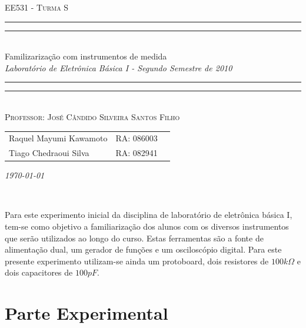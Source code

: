 \documentclass[a4paper]{article} %
\date{Agosto 20, 2010}
\newcommand*{\titleTMB}{\begingroup \centering \settowidth{\unitlength}{\LARGE EE531} {\large\scshape EE531 - Turma S}\\[0.2\baselineskip] \rule{11.0cm}{1.6pt}\vspace*{-\baselineskip}\vspace*{2pt} \rule{11.0cm}{0.4pt}\\[\baselineskip] {\LARGE  Familizarização com instrumentos de medida}\\\vspace*{\baselineskip}  {\itshape Laboratório de Eletrônica Básica I - Segundo Semestre de 2010}\\ \rule{11.0cm}{0.4pt}\vspace*{-\baselineskip}\vspace{3.2pt} \rule{11.0cm}{1.6pt}\\[\baselineskip] {\large\scshape Professor: José Cândido Silveira Santos Filho}\par \vfill {\normalsize   \scshape 
    \begin{center} 
      \begin{tabular}{  l  l  p{5cm} } 
        Raquel Mayumi Kawamoto & RA: 086003\\
        Tiago Chedraoui Silva  & RA: 082941\\
      \end{tabular} \end{center}
    \itshape \today   }\\[\baselineskip] \vspace{3.2pt} \endgroup}
\begin{document}
\titleTMB 
\newpage



Para este experimento inicial da disciplina de laboratório de eletrônica básica I, tem-se como objetivo a familiarização dos alunos com os diversos instrumentos que serão utilizados ao longo do curso. Estas ferramentas são a fonte de alimentação dual, um gerador de funções e um osciloscópio digital. Para este presente experimento utilizam-se ainda um protoboard, dois resistores de 
$100k\Omega$ e dois capacitores de $100pF$. 
	

\section*{Parte Experimental}
\end{document}

